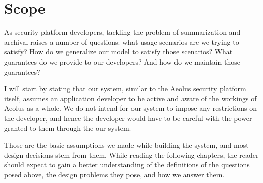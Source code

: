 \section{Scope}

As security platform developers, tackling the problem of summarization and archival raises a number of questions: what usage scenarios are we trying to satisfy? How do we generalize our model to satisfy those scenarios? What guarantees do we provide to our developers? And how do we maintain those guarantees?

I will start by stating that our system, similar to the Aeolus security platform itself, assumes an application developer to be active and aware of the workings of Aeolus as a whole. We do not intend for our system to impose any restrictions on the developer, and hence the developer would have to be careful with the power granted to them through the our system.

Those are the basic assumptions we made while building the system, and most design decisions stem from them. While reading the following chapters, the reader should expect to gain a better understanding of the definitions of the questions posed above, the design problems they pose, and how we answer them.
